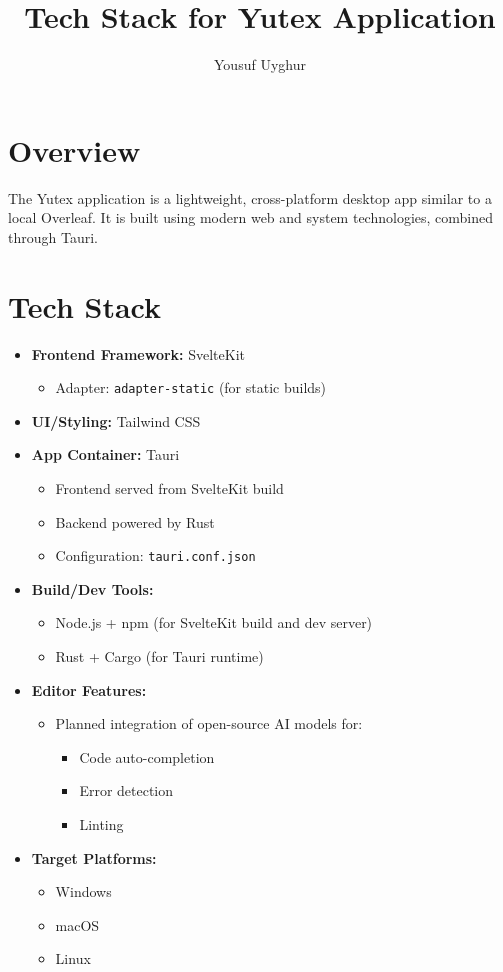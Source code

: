 \documentclass[12pt,a4paper]{article}
\title{Tech Stack for Yutex Application}
\author{Yousuf Uyghur}
\date{}
\begin{document}
\maketitle

\section*{Overview}
The Yutex application is a lightweight, cross-platform desktop app similar to a local Overleaf.  
It is built using modern web and system technologies, combined through Tauri.

\section*{Tech Stack}

\begin{itemize}[label=\textbullet]
    \item \textbf{Frontend Framework:} SvelteKit
    \begin{itemize}
        \item Adapter: \texttt{adapter-static} (for static builds)
    \end{itemize}

    \item \textbf{UI/Styling:} Tailwind CSS

    \item \textbf{App Container:} Tauri
    \begin{itemize}
        \item Frontend served from SvelteKit build
        \item Backend powered by Rust
        \item Configuration: \texttt{tauri.conf.json}
    \end{itemize}

    \item \textbf{Build/Dev Tools:}
    \begin{itemize}
        \item Node.js + npm (for SvelteKit build and dev server)
        \item Rust + Cargo (for Tauri runtime)
    \end{itemize}

    \item \textbf{Editor Features:} 
    \begin{itemize}
        \item Planned integration of open-source AI models for:
        \begin{itemize}
            \item Code auto-completion
            \item Error detection
            \item Linting
        \end{itemize}
    \end{itemize}

    \item \textbf{Target Platforms:} 
    \begin{itemize}
        \item Windows
        \item macOS
        \item Linux
    \end{itemize}
\end{itemize}
\end{document}
